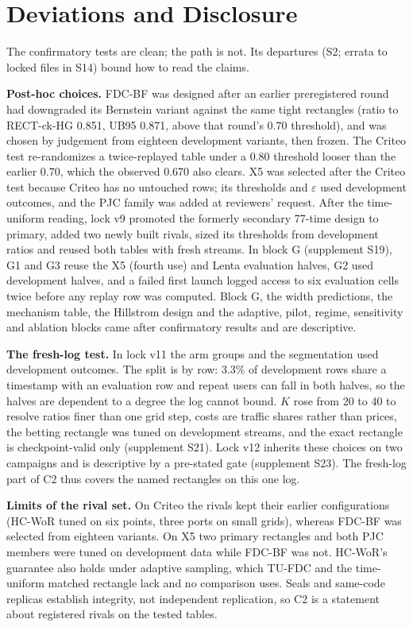 \documentclass[sigconf,anonymous,review]{acmart}
\newcommand{\eps}{\varepsilon}
\begin{document}
\section{Deviations and Disclosure}\label{sec:deviations}

The confirmatory tests are clean; the path is not. Its departures (S2; errata to locked files in S14) bound how to read the claims.

\textbf{Post-hoc choices.} FDC-BF was designed after an earlier preregistered round had downgraded its Bernstein variant against the same tight rectangles (ratio to RECT-ck-HG 0.851, UB95 0.871, above that round's 0.70 threshold), and was chosen by judgement from eighteen development variants, then frozen. The Criteo test re-randomizes a twice-replayed table under a 0.80 threshold looser than the earlier 0.70, which the observed 0.670 also clears. X5 was selected after the Criteo test because Criteo has no untouched rows; its thresholds and $\eps$ used development outcomes, and the PJC family was added at reviewers' request. After the time-uniform reading, lock v9 promoted the formerly secondary 77-time design to primary, added two newly built rivals, sized its thresholds from development ratios and reused both tables with fresh streams. In block G (supplement S19), G1 and G3 reuse the X5 (fourth use) and Lenta evaluation halves, G2 used development halves, and a failed first launch logged access to six evaluation cells twice before any replay row was computed. Block G, the width predictions, the mechanism table, the Hillstrom design and the adaptive, pilot, regime, sensitivity and ablation blocks came after confirmatory results and are descriptive.

\textbf{The fresh-log test.} In lock v11 the arm groups and the segmentation used development outcomes. The split is by row: 3.3\% of development rows share a timestamp with an evaluation row and repeat users can fall in both halves, so the halves are dependent to a degree the log cannot bound. $K$ rose from 20 to 40 to resolve ratios finer than one grid step, costs are traffic shares rather than prices, the betting rectangle was tuned on development streams, and the exact rectangle is checkpoint-valid only (supplement S21). Lock v12 inherits these choices on two campaigns and is descriptive by a pre-stated gate (supplement S23). The fresh-log part of C2 thus covers the named rectangles on this one log.

\textbf{Limits of the rival set.} On Criteo the rivals kept their earlier configurations (HC-WoR tuned on six points, three ports on small grids), whereas FDC-BF was selected from eighteen variants. On X5 two primary rectangles and both PJC members were tuned on development data while FDC-BF was not. HC-WoR's guarantee also holds under adaptive sampling, which TU-FDC and the time-uniform matched rectangle lack and no comparison uses. Seals and same-code replicas establish integrity, not independent replication, so C2 is a statement about registered rivals on the tested tables.
\end{document}
